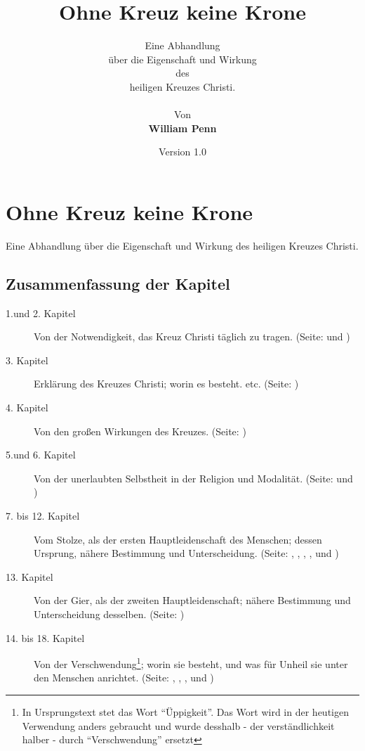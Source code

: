 \documentclass[a5paper,pagesize,10pt]{scrbook}
\begin{document}
\author{
Eine Abhandlung \\
über die Eigenschaft und Wirkung
\\
des
\\
heiligen Kreuzes Christi.
\\
\\
Von
\\
\textbf{William Penn}
}

\title{Ohne Kreuz keine Krone}
\date{Version 1.0}

\maketitle

\frontmatter

\tableofcontents


%

\mainmatter
\part{Ohne Kreuz keine Krone}
Eine Abhandlung über die Eigenschaft und Wirkung des
heiligen Kreuzes Christi.



\chapter{Zusammenfassung der Kapitel}
\begin{description}
\item[1.und 2. Kapitel] Von der Notwendigkeit, das Kreuz Christi täglich zu
tragen. (Seite: \pageref{kap1} und  \pageref{kap2})
\item[3. Kapitel] Erklärung des Kreuzes Christi; worin es besteht. etc. (Seite:
\pageref{kap3})
\item[4. Kapitel] Von den großen Wirkungen des Kreuzes. (Seite: \pageref{kap4})
\item[5.und 6. Kapitel] Von der unerlaubten Selbstheit in der Religion und
Modalität. (Seite: \pageref{kap5} und \pageref{kap6})
\item[7. bis 12. Kapitel] Vom Stolze, als der ersten Hauptleidenschaft des
Menschen; dessen Ursprung, nähere Bestimmung und Unterscheidung. (Seite:
\pageref{kap7}, \pageref{kap8}, \pageref{kap9}, \pageref{kap10}, \pageref{kap11}
und \pageref{kap12})
\item[13. Kapitel] Von der Gier, als der zweiten Hauptleidenschaft; nähere
Bestimmung und Unterscheidung desselben. (Seite: \pageref{kap13})
\item[14. bis 18. Kapitel] Von der Verschwendung\footnote{In Ursprungstext stet
das Wort "`Üppigkeit"'. Das Wort wird in der heutigen Verwendung anders
gebraucht und wurde desshalb - der verständlichkeit halber - durch
"`Verschwendung"' ersetzt}; worin sie besteht, und was für Unheil sie unter den
Menschen anrichtet. (Seite: \pageref{kap14}, \pageref{kap15} , \pageref{kap16} ,
\pageref{kap17} und \pageref{kap18})
\end{description}
\end{document}
